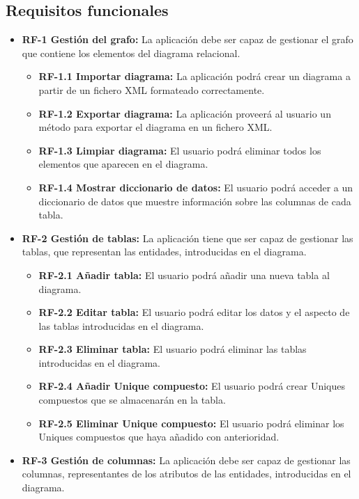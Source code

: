 \subsection{Requisitos funcionales}
\begin{itemize}
    \item \textbf{RF-1 Gestión del grafo: } La aplicación debe ser capaz de gestionar el grafo que contiene los elementos del diagrama relacional.
    \begin{itemize}
        \item \textbf{RF-1.1 Importar diagrama: }La aplicación podrá crear un diagrama a partir de un fichero XML formateado correctamente.
        \item \textbf{RF-1.2 Exportar diagrama: }La aplicación proveerá al usuario un método para exportar el diagrama en un fichero XML.
        \item \textbf{RF-1.3 Limpiar diagrama: }El usuario podrá eliminar todos los elementos que aparecen en el diagrama.
        \item \textbf{RF-1.4 Mostrar diccionario de datos: }El usuario podrá acceder a un diccionario de datos que muestre información sobre las columnas de cada tabla.
    \end{itemize}
    \item \textbf{RF-2 Gestión de tablas: }La aplicación tiene que ser capaz de gestionar las tablas, que representan las entidades, introducidas en el diagrama.
    \begin{itemize}
        \item \textbf{RF-2.1 Añadir tabla: }El usuario podrá añadir una nueva tabla al diagrama.
        \item \textbf{RF-2.2 Editar tabla: }El usuario podrá editar los datos y el aspecto de las tablas introducidas en el diagrama.
        \item \textbf{RF-2.3 Eliminar tabla: }El usuario podrá eliminar las tablas introducidas en el diagrama.
        \item \textbf{RF-2.4 Añadir Unique compuesto: }El usuario podrá crear Uniques compuestos que se almacenarán en la tabla.
        \item \textbf{RF-2.5 Eliminar Unique compuesto: }El usuario podrá eliminar los Uniques compuestos que haya añadido con anterioridad.
    \end{itemize}
    \item \textbf{RF-3 Gestión de columnas: }La aplicación debe ser capaz de gestionar las columnas, representantes de los atributos de las entidades, introducidas en el diagrama.

\end{itemize}
